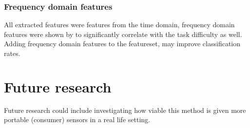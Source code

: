 \documentclass[12pt,leqno,letterpaper]{report} %
\begin{document}
\subsubsection{Frequency domain features}
All extracted features were features from the time domain, frequency domain features were shown by \citep{Nourbakhsh2012} to significantly correlate with the task difficulty as well. Adding frequency domain features to the featureset, may improve classification rates.

\section{Future research}
Future research could include investigating how viable this method is given more portable (consumer) sensors in a real life setting. 





{}
%
\end{document}
